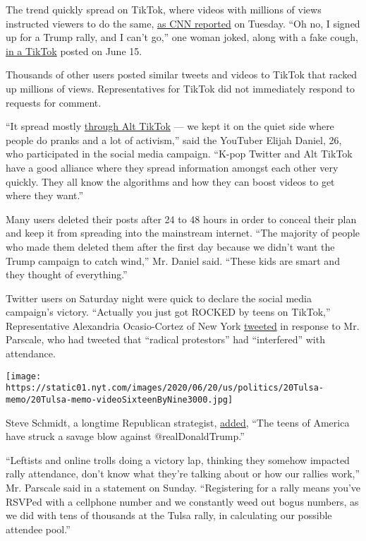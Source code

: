 The trend quickly spread on TikTok, where videos with millions of views
instructed viewers to do the same,
\href{https://www.cnn.com/2020/06/16/politics/tiktok-trump-tulsa-rally-trnd/index.html}{as
CNN reported} on Tuesday. ``Oh no, I signed up for a Trump rally, and I
can't go,'' one woman joked, along with a fake cough,
\href{https://www.tiktok.com/@proloser12245/video/6838621598229056773}{in
a TikTok} posted on June 15.

Thousands of other users posted similar tweets and videos to TikTok that
racked up millions of views. Representatives for TikTok did not
immediately respond to requests for comment.

``It spread mostly
\href{https://www.nytimes.com/2020/06/10/style/elite-tiktok.html}{through
Alt TikTok} --- we kept it on the quiet side where people do pranks and
a lot of activism,'' said the YouTuber Elijah Daniel, 26, who
participated in the social media campaign. ``K-pop Twitter and Alt
TikTok have a good alliance where they spread information amongst each
other very quickly. They all know the algorithms and how they can boost
videos to get where they want.''

Many users deleted their posts after 24 to 48 hours in order to conceal
their plan and keep it from spreading into the mainstream internet.
``The majority of people who made them deleted them after the first day
because we didn't want the Trump campaign to catch wind,'' Mr. Daniel
said. ``These kids are smart and they thought of everything.''

Twitter users on Saturday night were quick to declare the social media
campaign's victory. ``Actually you just got ROCKED by teens on TikTok,''
Representative Alexandria Ocasio-Cortez of New York
\href{https://twitter.com/AOC/status/1274499021625794565?s=20}{tweeted}
in response to Mr. Parscale, who had tweeted that ``radical protestors''
had ``interfered'' with attendance.

\texttt{[image: https://static01.nyt.com/images/2020/06/20/us/politics/20Tulsa-memo/20Tulsa-memo-videoSixteenByNine3000.jpg]}

Steve Schmidt, a longtime Republican strategist,
\href{https://twitter.com/SteveSchmidtSES/status/1274486428160811009}{added},
``The teens of America have struck a savage blow against
@realDonaldTrump.''

``Leftists and online trolls doing a victory lap, thinking they somehow
impacted rally attendance, don't know what they're talking about or how
our rallies work,'' Mr. Parscale said in a statement on Sunday.
``Registering for a rally means you've RSVPed with a cellphone number
and we constantly weed out bogus numbers, as we did with tens of
thousands at the Tulsa rally, in calculating our possible attendee
pool.''

